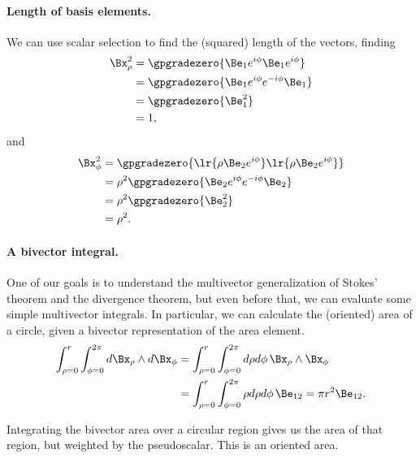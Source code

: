 \paragraph{Length of basis elements.}
We can use scalar selection to find the (squared) length of the vectors, finding
\begin{equation}\label{eqn:2Dcylindrical:680}
\begin{aligned}
\Bx_\rho^2
&= \gpgradezero{ \Be_1 e^{i \phi} \Be_1 e^{i \phi} } \\
&= \gpgradezero{ \Be_1 e^{i \phi} e^{-i\phi} \Be_1 } \\
&= \gpgradezero{ \Be_1^2 } \\
&= 1,
\end{aligned}
\end{equation}
and
\begin{equation}\label{eqn:2Dcylindrical:700}
\begin{aligned}
\Bx_\phi^2
&= \gpgradezero{ \lr{ \rho \Be_2 e^{i \phi} } \lr{ \rho \Be_2 e^{i \phi} } } \\
&= \rho^2 \gpgradezero{ \Be_2 e^{i \phi} e^{-i\phi} \Be_2 } \\
&= \rho^2 \gpgradezero{ \Be_2^2 } \\
&= \rho^2.
\end{aligned}
\end{equation}
\paragraph{A bivector integral.}
One of our goals is to understand the multivector generalization of Stokes' theorem and the divergence theorem, but even before that, we can evaluate some simple multivector integrals.  In particular, we can calculate the (oriented) area of a circle, given a bivector representation of the area element.
\begin{equation}\label{eqn:2Dcylindrical:360}
\begin{aligned}
\int_{\rho=0}^r
\int_{\phi=0}^{2\pi}
 d\Bx_\rho \wedge d\Bx_\phi
 &=
\int_{\rho=0}^r
\int_{\phi=0}^{2\pi}
d\rho d\phi\,
\Bx_\rho \wedge \Bx_\phi \\
&=
\int_{\rho=0}^r
\int_{\phi=0}^{2\pi}
\rho d\rho d\phi \, \Be_{12}
= \pi r^2 \Be_{12}.
\end{aligned}
\end{equation}

Integrating the bivector area over a circular region gives us the area of that region, but weighted by the  pseudoscalar.  This is an oriented area.
